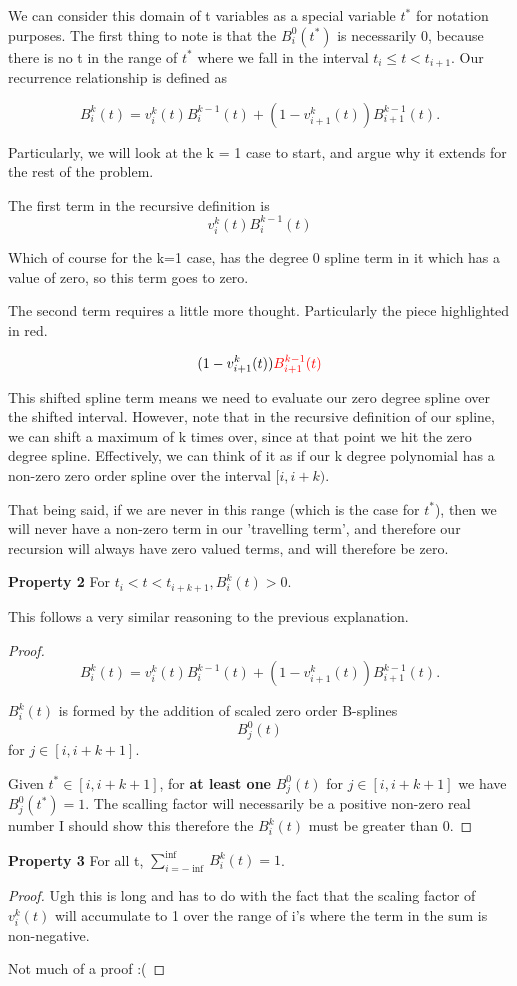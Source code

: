 \documentclass[12pt]{article}
\newenvironment{problem}[2][Problem]{\begin{trivlist}
\item[\hskip \labelsep {\bfseries #1}\hskip \labelsep {\bfseries #2.}]}{\end{trivlist}}
\begin{document}
\begin{problem}{7.11}
{We can consider this domain of t variables as a special variable $t^*$ for notation purposes. The first thing to note is that the $B_i^0(t^*)$ is necessarily 0, because there is no t in the range of $t^*$ where we fall in the interval $t_i \leq t < t_{i+1}$.
Our recurrence relationship is defined as

$$B_i^k(t) = v_i^k(t)B_i^{k-1}(t)+(1-v_{i+1}^k(t))B_{i+1}^{k-1}(t).$$

Particularly, we will look at the k = 1 case to start, and argue why it extends for the rest of the problem.

The first term in the recursive definition is
$$v_i^k(t)B_i^{k-1}(t)$$

Which of course for the k=1 case, has the degree 0 spline term in it which has a value of zero, so this term goes to zero.

The second term requires a little more thought. Particularly the piece highlighted in red.

$$(1-v_{i+1}^k(t))\color{red}B_{i+1}^{k-1}(t)$$

This shifted spline term means we need to evaluate our zero degree spline over the shifted interval. However, note that in the recursive definition of our spline, we can shift a maximum of k times over, since at that point we hit the zero degree spline. Effectively, we can think of it as if our k degree polynomial has a non-zero zero order spline over the interval $[i, i+k)$.

That being said, if we are never in this range (which is the case for $t^*$), then we will never have a non-zero term in our 'travelling term', and therefore our recursion will always have zero valued terms, and will therefore be zero.

}
\textbf{Property 2} For $t_i < t < t_{i+k+1}, B_i^k(t)>0.$

This follows a very similar reasoning to the previous explanation.

\begin{proof}

$$B_i^k(t) = v_i^k(t)B_i^{k-1}(t)+(1-v_{i+1}^k(t))B_{i+1}^{k-1}(t).$$

$B_i^k(t)$ is formed by the addition of scaled zero order B-splines $$B_j^0(t)$$ for $j \in [i, i + k + 1]$.

Given $t^* \in [i, i+k+1]$, for \textbf{at least one} $B_j^0(t)$ for $j \in [i, i + k + 1]$ we have $B_j^0(t^*)=1$. The scalling factor will necessarily be a positive non-zero real number {\color{red} I should show this} therefore the $B_i^k(t)$ must be greater than 0.
\end{proof}

\textbf{Property 3} For all t, $\sum_{i=-\inf}^{\inf}B_i^k(t)=1$.

\begin{proof}
Ugh this is long and has to do with the fact that the scaling factor of $v_i^k(t)$ will accumulate to 1 over the range of i's where the term in the sum is non-negative.

Not much of a proof :(
\end{proof}

\end{problem}
\end{document}
